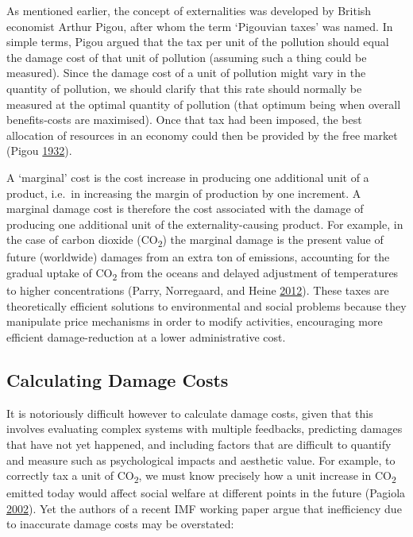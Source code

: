 \documentclass[]{tufte-handout}
\begin{document}
As mentioned earlier, the concept of externalities was developed by
British economist Arthur Pigou, after whom the term `Pigouvian taxes'
was named. In simple terms, Pigou argued that the tax per unit of the
pollution should equal the damage cost of that unit of pollution
(assuming such a thing could be measured). Since the damage cost of a
unit of pollution might vary in the quantity of pollution, we should
clarify that this rate should normally be measured at the optimal
quantity of pollution (that optimum being when overall benefits-costs
are maximised). Once that tax had been imposed, the best allocation of
resources in an economy could then be provided by the free market (Pigou
\protect\hyperlink{ref-Pigou1932}{1932}).

A `marginal' cost is the cost increase in producing one additional unit
of a product, i.e.~in increasing the margin of production by one
increment. A marginal damage cost is therefore the cost associated with
the damage of producing one additional unit of the externality-causing
product. For example, in the case of carbon dioxide
(CO\textsubscript{2}) the marginal damage is the present value of future
(worldwide) damages from an extra ton of emissions, accounting for the
gradual uptake of CO\textsubscript{2} from the oceans and delayed
adjustment of temperatures to higher concentrations (Parry, Norregaard,
and Heine \protect\hyperlink{ref-Parry2012}{2012}). These taxes are
theoretically efficient solutions to environmental and social problems
because they manipulate price mechanisms in order to modify activities,
encouraging more efficient damage-reduction at a lower administrative
cost.

\hypertarget{calculating-damage-costs}{%
\subsection{Calculating Damage Costs}\label{calculating-damage-costs}}

It is notoriously difficult however to calculate damage costs, given
that this involves evaluating complex systems with multiple feedbacks,
predicting damages that have not yet happened, and including factors
that are difficult to quantify and measure such as psychological impacts
and aesthetic value. For example, to correctly tax a unit of
CO\textsubscript{2}, we must know precisely how a unit increase in
CO\textsubscript{2} emitted today would affect social welfare at
different points in the future (Pagiola
\protect\hyperlink{ref-Pagiola2002}{2002}). Yet the authors of a recent
IMF working paper argue that inefficiency due to inaccurate damage costs
may be overstated:
\end{document}
